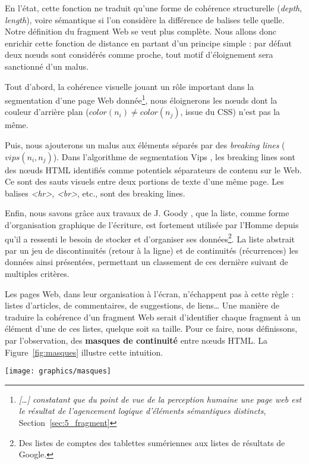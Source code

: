 \documentclass[symmetric,justified,marginals=raggedouter]{tufte-book}
\begin{document}
\noindent En l'état, cette fonction ne traduit qu'une forme de cohérence structurelle (\textit{depth}, \textit{length}), voire sémantique si l'on considère la différence de balises telle quelle. Notre définition du fragment Web se veut plus complète. Nous allons donc enrichir cette fonction de distance en partant d'un principe simple : par défaut deux nœuds sont considérés comme proche, tout motif d'éloignement sera sanctionné d'un malus.

Tout d'abord, la cohérence visuelle jouant un rôle important dans la segmentation d'une page Web donnée\footnote{\RaggedOuter \og\textit{[\ldots{}] constatant que du point de vue de la perception humaine \citep{bernard_criteria_2003, michailidou_visual_2008} une page web est le résultat de l'agencement logique d'éléments sémantiques distincts}\fg{},  Section~\ref{sec:5_fragment}}, nous éloignerons les nœuds dont la couleur d'arrière plan ($color(n_i) \neq color(n_j)$, issue du CSS) n'est pas la même.

Puis, nous ajouterons un malus aux éléments séparés par des \textit{breaking lines} ($vips(n_i,n_j)$). Dans l'algorithme de segmentation Vips \citep{cai_vips:_2003}, les breaking lines sont des nœuds HTML identifiés comme potentiels séparateurs de contenu sur le Web. Ce sont des sauts visuels entre deux portions de texte d'une même page. Les balises \textit{<hr>}, \textit{<br>}, etc., sont des breaking lines.   

Enfin, nous savons grâce aux travaux de J. Goody \citep{goody_raison_1979}, que la liste, comme forme d'organisation graphique de l'écriture, est fortement utilisée par l'Homme depuis qu'il a ressenti le besoin de stocker et d'organiser ses données\footnote{\RaggedOuter Des listes de comptes des tablettes sumériennes aux listes de résultats de Google.}. La liste abstrait par un jeu de discontinuités (retour à la ligne) et de continuités (récurrences) les données ainsi présentées, permettant un classement de ces dernière suivant de multiples critères. 

Les pages Web, dans leur organisation à l'écran, n'échappent pas à cette règle : listes d'articles, de commentaires, de suggestions, de liens\ldots{} Une manière de traduire la cohérence d'un fragment Web serait d'identifier chaque fragment à un élément d'une de ces listes, quelque soit sa taille. Pour ce faire, nous définissons, par l'observation, des \textbf{masques de continuité} entre nœuds HTML. La Figure~\ref{fig:masques} illustre cette intuition. 

\begin{figure*}%
  \texttt{[image: graphics/masques]}
  \caption{Ségmentation d'une page Web suivant des masques de continuité}
  \label{fig:masques}
\end{figure*}
\end{document}
